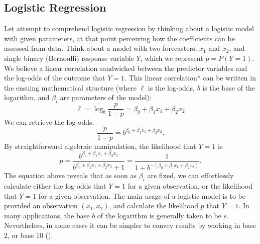 \documentclass[12pt]{article}
\begin{document}
\subsection{Logistic Regression}
Let attempt to comprehend logistic regression by thinking about a logistic model with given parameters, at that point perceiving how the coefficients can be assessed from data. Think about a model with two forecasters, {${\displaystyle x_{1}}$} and {${\displaystyle x_{2}}$}, and single binary (Bernoulli) response variable {${\displaystyle Y}$}, which we represent {${\displaystyle p=P(Y=1)}$}. We believe a linear correlation sandwiched between the predictor variables and the log-odds of the outcome that {${\displaystyle Y=1}$}. This linear correlation* can be written in the ensuing mathematical structure (where {${\displaystyle \ell}$} is the log-{}odds, {${\displaystyle b}$} is the base of the logarithm, and {${\displaystyle \beta _{i}}$} are parameters of the model):
\begin{equation}
	{{\displaystyle \ell =\log _{b}{\frac {p}{1-p}}=\beta _{0}+\beta _{1}x_{1}+\beta _{2}x_{2}}}
\end{equation}
We can retrieve the log-odds:
\begin{equation}
	{{\displaystyle {\frac {p}{1-p}}=b^{\beta _{0}+\beta _{1}x_{1}+\beta _{2}x_{2}}}}.
\end{equation}
By straightforward algebraic manipulation, the likelihood that {${\displaystyle Y=1}$} is
\begin{equation}
	{{\displaystyle p={\frac {b^{\beta _{0}+\beta _{1}x_{1}+\beta _{2}x_{2}}}{b^{\beta _{0}+\beta _{1}x_{1}+\beta _{2}x_{2}}+1}}={\frac {1}{1+b^{-(\beta _{0}+\beta _{1}x_{1}+\beta _{2}x_{2})}}}}}.
\end{equation}
The equation above reveals that as soon as {${\displaystyle \beta _{i}}$} are fixed, we can effortlessly calculate either the log-odds that {${\displaystyle Y=1}$} for a given observation, or the likelihood that {${\displaystyle Y=1}$} for a given observation. The main usage of a logistic model is to be provided an observation {${\displaystyle (x_{1},x_{2})}$}, and calculate the likelihood {${\displaystyle p}$} that {${\displaystyle Y=1}$}. In many applications, the base {${\displaystyle b}$} of the logarithm is generally taken to be {${\displaystyle e}$}. Nevertheless, in some cases it can be simpler to convey results by working in base 2, or base 10 (\cite{ref-wiki:xxx}).
\end{document}
